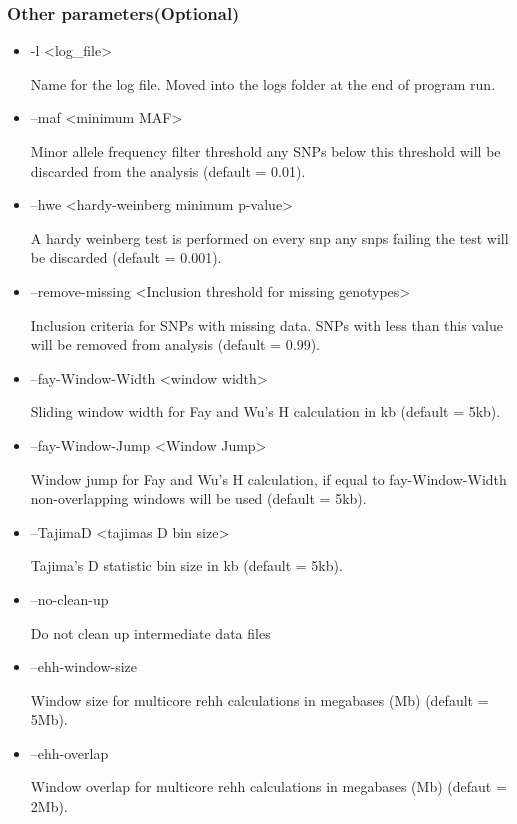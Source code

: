 \documentclass[a4paper,10pt]{article}
\begin{document}
\subsubsection{Other parameters(Optional)}
\begin{itemize}
\item -l <log\_file> 

Name for the log file. Moved into the logs folder at the end of program run.

\item --maf <minimum MAF>

Minor allele frequency filter threshold any SNPs below this threshold
will be discarded from the analysis (default = 0.01).

\item --hwe <hardy-weinberg minimum p-value>

A hardy weinberg test is performed on every snp any snps failing the
test will be discarded (default = 0.001).

\item --remove-missing <Inclusion threshold for missing genotypes>

Inclusion criteria for SNPs with missing data. SNPs with less than
this value will be removed from analysis (default = 0.99).

\item --fay-Window-Width <window width>

Sliding window width for Fay and Wu's H calculation in kb (default = 5kb).

\item --fay-Window-Jump <Window Jump>

Window jump for Fay and Wu's H calculation, if equal to
fay-Window-Width non-overlapping windows will be used (default =
5kb).

\item --TajimaD <tajimas D bin size>

Tajima's D statistic bin size in kb (default = 5kb).
\item --no-clean-up 

Do not clean up intermediate data files

\item --ehh-window-size

Window size for multicore rehh calculations in megabases (Mb) (default = 5Mb). 

\item --ehh-overlap

Window overlap for multicore rehh calculations in megabases (Mb) (defaut = 2Mb).


\end{itemize}
\end{document}
